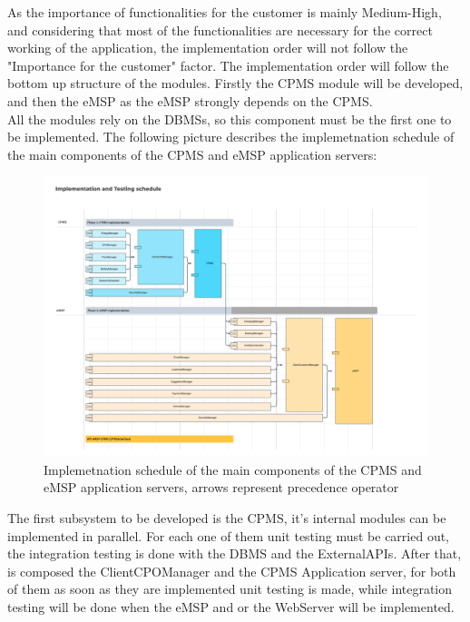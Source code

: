 As the importance of functionalities for the customer is mainly Medium-High, and considering that most of the functionalities are necessary for the correct working of the application, the implementation order will not follow the "Importance for the customer" factor. The implementation order will follow the bottom up structure of the modules. Firstly the CPMS module will be developed, and then the eMSP as the eMSP strongly depends on the CPMS.\\

All the modules rely on the DBMSs, so this component must be the first one to be implemented.
The following picture describes the implemetnation schedule of the main components of the CPMS and eMSP application servers:
\begin{center}
    \begin{figure}[H]
        \includegraphics[width=\textwidth]{./img/ImplementationOrder.png}
        \caption{Implemetnation schedule of the main components of the CPMS and eMSP application servers, arrows represent precedence operator}
    \end{figure}
\end{center}

The first subsystem to be developed is the CPMS, it's internal modules can be implemented in parallel. For each one of them unit testing must be carried out, the integration testing is done with the DBMS and the ExternalAPIs. After that, is composed the ClientCPOManager and the CPMS Application server, for both of them as soon as they are implemented unit testing is made, while integration testing will be done when the eMSP and or the WebServer will be implemented. \\

